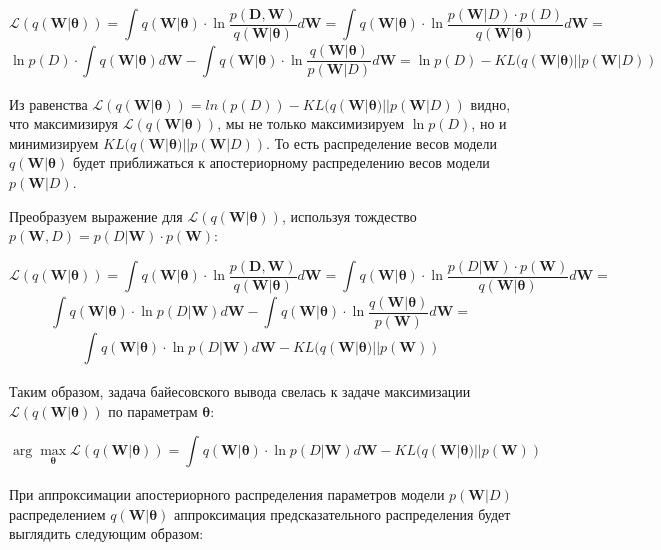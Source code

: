 \documentclass{article}
\newcommand{\argmax}{\arg\!\max}
\begin{document}
\[
\mathcal{L}(q(\mathbf{W} | \pmb{\theta})) =
\int_{}{} q(\mathbf{W} | \pmb{\theta}) \cdot \ln{\dfrac{p(\mathbf{D}, \mathbf{W})}{q(\mathbf{W} | \pmb{\theta})}} d\mathbf{W} =
\int_{}{} q(\mathbf{W} | \pmb{\theta}) \cdot \ln{\dfrac{p(\mathbf{W}| D) \cdot p(D)}{q(\mathbf{W} | \pmb{\theta})}} d\mathbf{W} =
\]\[
\ln{p(D)} \cdot \int_{}{} q(\mathbf{W} | \pmb{\theta}) d\mathbf{W} - \int_{}{} q(\mathbf{W} | \pmb{\theta})\cdot \ln{\dfrac{q(\mathbf{W} | \pmb{\theta})}{p(\mathbf{W}| D)}} d\mathbf{W} =
\ln{p(D)} - KL(q(\mathbf{W} | \pmb{\theta}) || p(\mathbf{W}| D))
\]

Из равенства $\mathcal{L}(q(\mathbf{W} | \pmb{\theta})) = ln(p(D)) - KL(q(\mathbf{W} | \pmb{\theta}) || p(\mathbf{W}| D))$ видно, что максимизируя $\mathcal{L}(q(\mathbf{W} | \pmb{\theta}))$, мы не только максимизируем $\ln {p(D)}$, но и минимизируем $KL(q(\mathbf{W} | \pmb{\theta}) || p(\mathbf{W}| D))$. То есть распределение весов модели $q(\mathbf{W} | \pmb{\theta})$ будет приближаться к апостериорному распределению весов модели $p(\mathbf{W}| D)$.

Преобразуем выражение для $\mathcal{L}(q(\mathbf{W} | \pmb{\theta}))$, используя тождество
$p(\mathbf{W}, D) = p(D | \mathbf{W}) \cdot p(\mathbf{W})$:

\[
\mathcal{L}(q(\mathbf{W} | \pmb{\theta})) =
\int_{}{} q(\mathbf{W} | \pmb{\theta}) \cdot \ln{\dfrac{p(\mathbf{D}, \mathbf{W})}{q(\mathbf{W} | \pmb{\theta})}} d\mathbf{W} =
\int_{}{} q(\mathbf{W} | \pmb{\theta}) \cdot \ln{\dfrac{p(D | \mathbf{W}) \cdot p(\mathbf{W})}{q(\mathbf{W} | \pmb{\theta})}} d\mathbf{W} =
\]\[
\int_{}{} q(\mathbf{W} | \pmb{\theta}) \cdot \ln{p(D | \mathbf{W})} d\mathbf{W} - \int_{}{} q(\mathbf{W} | \pmb{\theta}) \cdot \ln{\dfrac{q(\mathbf{W} | \pmb{\theta})}{p(\mathbf{W})}} d\mathbf{W} =
\]\[
\int_{}{} q(\mathbf{W} | \pmb{\theta}) \cdot \ln{p(D | \mathbf{W})} d\mathbf{W} - KL(q(\mathbf{W} | \pmb{\theta}) || p(\mathbf{W}))
\]

Таким образом, задача байесовского вывода свелась к задаче максимизации $\mathcal{L}(q(\mathbf{W} | \pmb{\theta}))$ по параметрам $\pmb{\theta}$:

\[
\argmax_{\pmb{\theta}} \mathcal{L}(q(\mathbf{W} | \pmb{\theta})) =
\int_{}{} q(\mathbf{W} | \pmb{\theta}) \cdot \ln{p(D | \mathbf{W})} d\mathbf{W} - KL(q(\mathbf{W} | \pmb{\theta}) || p(\mathbf{W}))
\]

При аппроксимации апостериорного распределения параметров модели $p(\mathbf{W}| D)$ распределением $q(\mathbf{W} | \pmb{\theta})$ аппроксимация предсказательного распределения будет выглядить следующим образом:
\end{document}
